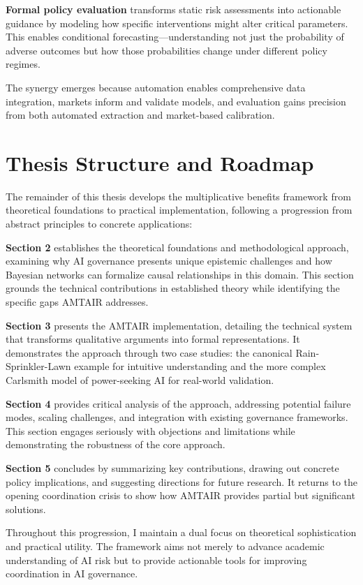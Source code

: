\documentclass[
  11pt,
  letterpaper,
]{book}
\begin{document}
\textbf{Formal policy evaluation} transforms static risk assessments
into actionable guidance by modeling how specific interventions might
alter critical parameters. This enables conditional
forecasting---understanding not just the probability of adverse outcomes
but how those probabilities change under different policy regimes.

The synergy emerges because automation enables comprehensive data
integration, markets inform and validate models, and evaluation gains
precision from both automated extraction and market-based calibration.

\section{Thesis Structure and Roadmap}\label{sec-roadmap}

The remainder of this thesis develops the multiplicative benefits
framework from theoretical foundations to practical implementation,
following a progression from abstract principles to concrete
applications:

\textbf{Section 2} establishes the theoretical foundations and
methodological approach, examining why AI governance presents unique
epistemic challenges and how Bayesian networks can formalize causal
relationships in this domain. This section grounds the technical
contributions in established theory while identifying the specific gaps
AMTAIR addresses.

\textbf{Section 3} presents the AMTAIR implementation, detailing the
technical system that transforms qualitative arguments into formal
representations. It demonstrates the approach through two case studies:
the canonical Rain-Sprinkler-Lawn example for intuitive understanding
and the more complex Carlsmith model of power-seeking AI for real-world
validation.

\textbf{Section 4} provides critical analysis of the approach,
addressing potential failure modes, scaling challenges, and integration
with existing governance frameworks. This section engages seriously with
objections and limitations while demonstrating the robustness of the
core approach.

\textbf{Section 5} concludes by summarizing key contributions, drawing
out concrete policy implications, and suggesting directions for future
research. It returns to the opening coordination crisis to show how
AMTAIR provides partial but significant solutions.

Throughout this progression, I maintain a dual focus on theoretical
sophistication and practical utility. The framework aims not merely to
advance academic understanding of AI risk but to provide actionable
tools for improving coordination in AI governance.
\end{document}
